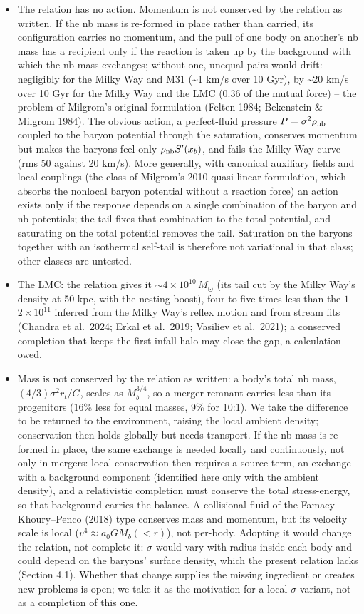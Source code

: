 \documentclass[
  10pt,
]{article}
\begin{document}
\begin{itemize}
\item The relation has no action. Momentum is not conserved by the relation as written. If the nb mass is re-formed in place rather than carried, its configuration carries no momentum, and the pull of one body on another's nb mass has a recipient only if the reaction is taken up by the background with which the nb mass exchanges; without one, unequal pairs would drift: negligibly for the Milky Way and M31 (\textasciitilde{}1 km/s over 10 Gyr), by \textasciitilde{}20 km/s over 10 Gyr for the Milky Way and the LMC (0.36 of the mutual force) -- the problem of Milgrom's original formulation (Felten 1984; Bekenstein \& Milgrom 1984). The obvious action, a perfect-fluid pressure $P=\sigma^2\rho_{\rm nb}$ coupled to the baryon potential through the saturation, conserves momentum but makes the baryons feel only $\rho_{\rm nb}S'(x_b)$, and fails the Milky Way curve (rms 50 against 20 km/s). More generally, with canonical auxiliary fields and local couplings (the class of Milgrom's 2010 quasi-linear formulation, which absorbs the nonlocal baryon potential without a reaction force) an action exists only if the response depends on a single combination of the baryon and nb potentials; the tail fixes that combination to the total potential, and saturating on the total potential removes the tail. Saturation on the baryons together with an isothermal self-tail is therefore not variational in that class; other classes are untested.
\item The LMC: the relation gives it $\sim4\times10^{10}\,M_\odot$ (its tail cut by the Milky Way's density at 50 kpc, with the nesting boost), four to five times less than the $1$--$2\times10^{11}$ inferred from the Milky Way's reflex motion and from stream fits (Chandra et al.~2024; Erkal et al.~2019; Vasiliev et al.~2021); a conserved completion that keeps the first-infall halo may close the gap, a calculation owed.
\item Mass is not conserved by the relation as written: a body's total nb mass, $(4/3)\sigma^2r_t/G$, scales as $M_b^{3/4}$, so a merger remnant carries less than its progenitors (16\% less for equal masses, 9\% for 10:1). We take the difference to be returned to the environment, raising the local ambient density; conservation then holds globally but needs transport. If the nb mass is re-formed in place, the same exchange is needed locally and continuously, not only in mergers: local conservation then requires a source term, an exchange with a background component (identified here only with the ambient density), and a relativistic completion must conserve the total stress-energy, so that background carries the balance. A collisional fluid of the Famaey--Khoury--Penco (2018) type conserves mass and momentum, but its velocity scale is local ($v^4\approx a_0GM_b(<r)$), not per-body. Adopting it would change the relation, not complete it: $\sigma$ would vary with radius inside each body and could depend on the baryons' surface density, which the present relation lacks (Section 4.1). Whether that change supplies the missing ingredient or creates new problems is open; we take it as the motivation for a local-$\sigma$ variant, not as a completion of this one.

\end{itemize}
\end{document}

